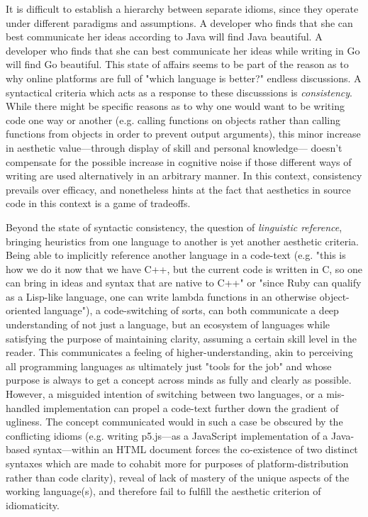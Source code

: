 It is difficult to establish a hierarchy between separate idioms, since they operate under different paradigms and assumptions. A developer who finds that she can best communicate her ideas according to Java will find Java beautiful. A developer who finds that she can best communicate her ideas while writing in Go will find Go beautiful. This state of affairs seems to be part of the reason as to why online platforms are full of "which language is better?" endless discussions. A syntactical criteria which acts as a response to these discusssions is \emph{consistency}. While there might be specific reasons as to why one would want to be writing code one way or another (e.g. calling functions on objects rather than calling functions from objects in order to prevent output arguments), this minor increase in aesthetic value—through display of skill and personal knowledge— doesn't compensate for the possible increase in cognitive noise if those different ways of writing are used alternatively in an arbitrary manner. In this context, consistency prevails over efficacy, and nonetheless hints at the fact that aesthetics in source code in this context is a game of tradeoffs.

Beyond the state of syntactic consistency, the question of \emph{linguistic reference}, bringing heuristics from one language to another is yet another aesthetic criteria. Being able to implicitly reference another language in a code-text (e.g. "this is how we do it now that we have C++, but the current code is written in C, so one can bring in ideas and syntax that are native to C++" or "since Ruby can qualify as a Lisp-like language, one can write lambda functions in an otherwise object-oriented language"), a code-switching of sorts, can both communicate a deep understanding of not just a language, but an ecosystem of languages while satisfying the purpose of maintaining clarity, assuming a certain skill level in the reader. This communicates a feeling of higher-understanding, akin to perceiving all programming languages as ultimately just "tools for the job" and whose purpose is always to get a concept across minds as fully and clearly as possible. However, a misguided intention of switching between two languages, or a mis-handled implementation can propel a code-text further down the gradient of ugliness. The concept communicated would in such a case be obscured by the conflicting idioms (e.g. writing p5.js—as a JavaScript implementation of a Java-based syntax—within an HTML document forces the co-existence of two distinct syntaxes which are made to cohabit more for purposes of platform-distribution rather than code clarity), reveal of lack of mastery of the unique aspects of the working language(s), and therefore fail to fulfill the aesthetic criterion of idiomaticity.

